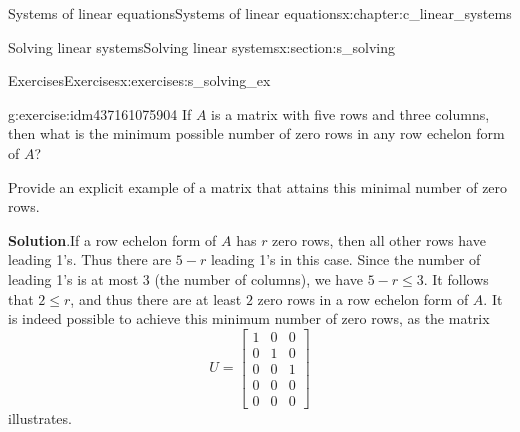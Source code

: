 \documentclass[oneside,10pt,]{book}
\newcommand{\blocktitlefont}{\relax}
\numberwithin{equation}{section}
\newcommand{\amp}{&}
\begin{document}
\begin{chapterptx}{Systems of linear equations}{}{Systems of linear equations}{}{}{x:chapter:c_linear_systems}
\begin{sectionptx}{Solving linear systems}{}{Solving linear systems}{}{}{x:section:s_solving}
\begin{exercises-subsection-numberless}{Exercises}{}{Exercises}{}{}{x:exercises:s_solving_ex}
\begin{divisionexercise}{14}{}{}{g:exercise:idm437161075904}
If \(A\) is a matrix with five rows and three columns, then what is the minimum possible number of zero rows in any row echelon form of \(A\)?%
\par
Provide an explicit example of a matrix that attains this minimal number of zero rows.%
\par\smallskip%
\noindent\textbf{\blocktitlefont Solution}.\hypertarget{g:solution:idm437161076320}{}\quad{}If a row echelon form of \(A\) has \(r\) zero rows, then all other rows have leading 1's. Thus there are \(5-r\) leading 1's in this case. Since the number of leading 1's is at most 3 (the number of columns), we have \(5-r\leq 3\). It follows that \(2\leq r\), and thus there are at least \(2\) zero rows in a row echelon form of \(A\). It is indeed possible to achieve this minimum number of zero rows, as the matrix%
\begin{equation*}
U=\begin{bmatrix}1\amp 0\amp 0\\ 0\amp 1\amp 0\\ 0\amp 0\amp 1\\ 0\amp 0\amp 0\\ 0\amp 0\amp 0 \end{bmatrix}
\end{equation*}
illustrates.%
\end{divisionexercise}%
\end{exercises-subsection-numberless}
\end{sectionptx}
\end{chapterptx}
%
%
\typeout{************************************************}
\typeout{************************************************}
%
\end{document}
